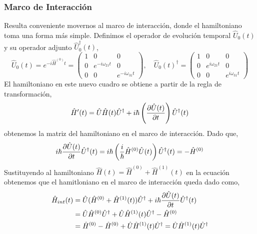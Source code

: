 \subsubsection*{Marco de Interacción}
Resulta conveniente movernos al marco de interacción, donde el hamiltoniano toma una forma más simple. Definimos el operador de evolución temporal $\hat{U}_0(t)$ y su operador adjunto  $\hat{U}_0^{\dagger}(t)$,
\begin{equation}
\hat{U}_0(t) = e^{-i \hat{H}^{(0)}t} = \begin{pmatrix}
    1 & 0 & 0 \\
    0 & e^{-i\omega_{21} t} & 0 \\
    0 & 0 & e^{-i\omega_{31} t}
\end{pmatrix}, \quad  \hat{U}_0(t)^{\dagger} = \begin{pmatrix}
    1 & 0 & 0 \\
    0 & e^{i\omega_{21} t} & 0 \\
    0 & 0 & e^{i\omega_{31} t}
\end{pmatrix}
\end{equation}
El hamiltoniano en este nuevo cuadro se obtiene a partir de la regla de transformación,
\begin{equation}
\hat{H}'(t) = \hat{U} \hat{H}(t) \hat{U}^{\dagger} + i \hbar \left(\pdv{\hat{U}(t)}{t}\right) \hat{U}^{\dagger}(t)
\end{equation} 
obtenemos la matriz del hamiltoniano en el marco de interacción. Dado que,
\begin{equation}
    i \hbar \pdv{\hat{U}(t)}{t} \hat{U}^{\dagger}(t) = i \hbar \left(\frac{i}{\hbar} \hat{H}^{(0)} \hat{U}(t)\right)  \hat{U}^{\dagger}(t) = - \hat{H}^{(0)}
\end{equation}
Sustituyendo al hamiltoniano $\hat{H}(t) = \hat{H}^{(0)} + \hat{H}^{(1)}(t)$ en la ecuación obtenemos que el hamitloniano en el marco de interacción queda dado como,
\begin{equation}
\begin{split}
\hat{H}_{int}(t) &= \hat{U} (\hat{H}^{(0)} + \hat{H}^{(1)}(t)) \hat{U}^{\dagger} + i \hbar \pdv{\hat{U}(t)}{t} \hat{U}^{\dagger}(t) \\
&= \hat{U} \hat{H}^{(0)} \hat{U}^{\dagger} + \hat{U} \hat{H}^{(1)}(t) \hat{U}^{\dagger} - \hat{H}^{(0)} \\
&= \hat{H}^{(0)} - \hat{H}^{(0)} + \hat{U} \hat{H}^{(1)}(t) \hat{U}^{\dagger} = \hat{U} \hat{H}^{(1)}(t) \hat{U}^{\dagger}
\end{split}
\end{equation}
